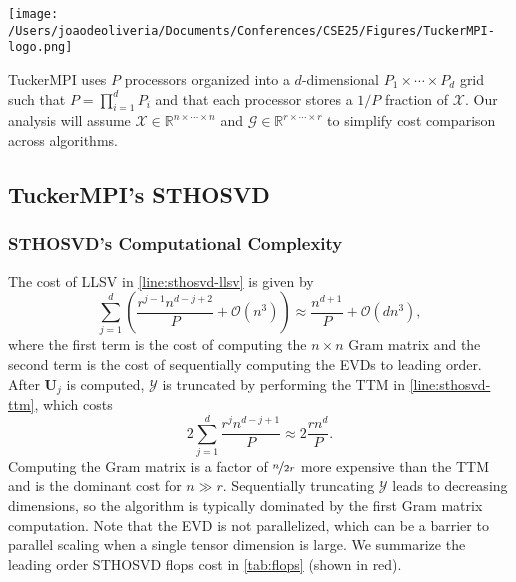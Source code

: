 
\begin{center}
    \texttt{[image: /Users/joaodeoliveria/Documents/Conferences/CSE25/Figures/TuckerMPI-logo.png]}
\end{center}

TuckerMPI uses $P$ processors organized into a $d$-dimensional $P_1\times \cdots
\times P_d$ grid such that $P = \prod_{i=1}^{d} P_i$ and that each processor
stores a $1/P$ fraction of $\mathcal{X}$. Our analysis will assume $\mathcal{X}
\in \mathbb{R}^{n\times \cdots \times n}$ and $\mathcal{G} \in
\mathbb{R}^{r\times \cdots \times r}$ to simplify cost comparison across
algorithms.

\subsection{TuckerMPI's STHOSVD}
    \subsubsection{STHOSVD's Computational Complexity}

        The cost of LLSV in \cref{line:sthosvd-llsv} is given by
        \begin{equation*}
            \sum_{j=1}^{d} \left(\frac{r^{j-1}n^{d-j+2}}{P} + \mathcal{O}(n^3)\right) \approx \frac{n^{d+1}}{P} + \mathcal{O}(dn^3),
        \end{equation*}
        where the first term is the cost of computing the $n \times n$ Gram matrix and
        the second term is the cost of sequentially computing the EVDs to leading order.
        After $\mathbf{U}_{j}$ is computed, $\mathcal{Y}$ is truncated by performing the TTM in
        \cref{line:sthosvd-ttm}, which costs
        \begin{equation*}
            2\sum_{j=1}^{d} \frac{r^j n^{d-j+1}}{P} \approx 2\frac{rn^d}{P}.
        \end{equation*}
        Computing the Gram matrix is a factor of $\nicefrac{n}{2r}$ more expensive than
        the TTM and is the dominant cost for $n \gg r$. Sequentially truncating $\mathcal{Y}$
        leads to decreasing dimensions, so the algorithm is typically dominated by the
        first Gram matrix computation. Note that the EVD is not parallelized, which can
        be a barrier to parallel scaling when a single tensor dimension is large. We
        summarize the leading order STHOSVD flops cost in \cref{tab:flops} (shown in
        red).


